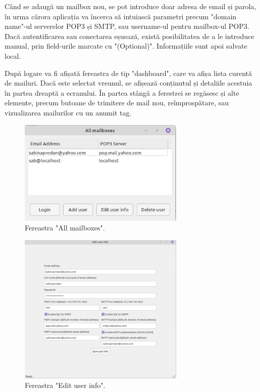\documentclass[runningheads]{llncs}
\begin{document}
Când se adaugă un mailbox nou, se pot introduce doar adresa de email și parola, în urma cărora aplicația va încerca să intuiască parametri precum "domain name"-ul serverelor POP3 și SMTP, sau username-ul pentru mailbox-ul POP3. Dacă autentificarea sau conectarea eșuează, există posibilitatea de a le introduce manual, prin field-urile marcate cu "(Optional)". Informațiile sunt apoi salvate local.

După logare va fi afișată fereastra de tip "dashboard", care va afișa lista curentă de mailuri. Dacă este selectat vreunul, se afișează conținutul și detaliile acestuia în partea dreaptă a ecranului. În partea stângă a ferestrei se regăsesc și alte elemente, precum butoane de trimitere de mail nou, reîmprospătare, sau vizualizarea mailurilor cu un anumit tag.

\begin{figure}
    \centering
    \includegraphics[width={300px}]{allMailboxes.png}
    \caption{Fereastra "All mailboxes".}
    \label{fig:allMailboxes}
\end{figure}

\begin{figure}
    \centering
    \includegraphics[width={300px}]{editUserInfo.png}
    \caption{Fereastra "Edit user info".}
    \label{fig:editUserInfo}
\end{figure}
\end{document}
